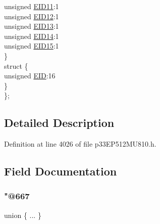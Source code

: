 \begin{DoxyCompactItemize}
\begin{tabbing}
\>\>unsigned \hyperlink{structtag_c1_r_x_f5_e_i_d_b_i_t_s_a710bdb0d602deb021b0be99066008018}{EID11}:1\\
\>\>unsigned \hyperlink{structtag_c1_r_x_f5_e_i_d_b_i_t_s_aa347bb85867bd8d4e0124f7cff8c6472}{EID12}:1\\
\>\>unsigned \hyperlink{structtag_c1_r_x_f5_e_i_d_b_i_t_s_a37d5f3edcbf6ef62f848fd4f3c584f79}{EID13}:1\\
\>\>unsigned \hyperlink{structtag_c1_r_x_f5_e_i_d_b_i_t_s_a7ffc0b0e0d99b8476b6f9a45337c17ab}{EID14}:1\\
\>\>unsigned \hyperlink{structtag_c1_r_x_f5_e_i_d_b_i_t_s_a293cd7dc1746257fa75a60cbd9383cd7}{EID15}:1\\
\>\} \\
\>struct \{\\
\>\>unsigned \hyperlink{structtag_c1_r_x_f5_e_i_d_b_i_t_s_ae80b378c9141f7c03e0b4e55b5f4b54d}{EID}:16\\
\>\} \\
\}; \\

\end{tabbing}\end{DoxyCompactItemize}


\subsection{Detailed Description}


Definition at line 4026 of file p33\+E\+P512\+M\+U810.\+h.



\subsection{Field Documentation}
\mbox{\label{structtag_c1_r_x_f5_e_i_d_b_i_t_s_ac808e5dbfd90e9f639ef79fe62a1b182}} 
\subsubsection{\texorpdfstring{"@667}{@667}}
{\footnotesize\ttfamily union \{ ... \} }

\mbox{\label{structtag_c1_r_x_f5_e_i_d_b_i_t_s_ae80b378c9141f7c03e0b4e55b5f4b54d}} 
